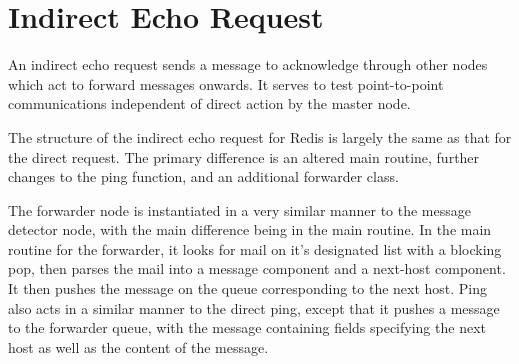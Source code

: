 \documentclass[10pt,a4paper]{article}
\begin{document}
\section{Indirect Echo Request}
An indirect echo request sends a message to acknowledge through other nodes which act to forward messages onwards.
It serves to test point-to-point communications independent of direct action by the master node.

The structure of the indirect echo request for Redis is largely the same as that for the direct request.
The primary difference is an altered main routine, further changes to the ping function, and an additional forwarder class.

The forwarder node is instantiated in a very similar manner to the message detector node, with the main difference being in the main routine.
In the main routine for the forwarder, it looks for mail on it's designated list with a blocking pop, then parses the mail into a message component and a next-host component. 
It then pushes the message on the queue corresponding to the next host.
Ping also acts in a similar manner to the direct ping, except that it pushes a message to the forwarder queue, with the message containing fields specifying the next host as well as the content of the message.



\printbibliography{}
\end{document}
